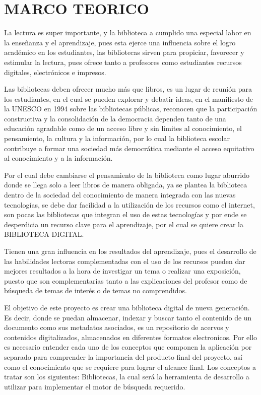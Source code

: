 \section{MARCO TEORICO} 

\begin{enumerate}[1.]
	
	La lectura es super importante, y la biblioteca a cumplido una especial labor en la enseñanza y el aprendizaje, pues esta ejerce una influencia sobre el logro académico en los estudiantes, las bibliotecas sirven para propiciar, favorecer y estimular la lectura, pues ofrece tanto a profesores como estudiantes recursos digitales, electrónicos e impresos. 
	
	Las bibliotecas deben ofrecer mucho más que libros, es un lugar de reunión para los estudiantes, en el cual se pueden explorar y debatir ideas, en el manifiesto de la UNESCO en 1994 sobre las bibliotecas públicas, reconocen que la participación constructiva y la consolidación de la democracia dependen tanto de una educación agradable como de un acceso libre y sin límites al conocimiento, el pensamiento, la cultura y la información, por lo cual la biblioteca escolar contribuye a formar una sociedad más democrática mediante el acceso equitativo al conocimiento y a la información.
	
	Por el cual debe cambiarse el pensamiento de la biblioteca como lugar aburrido donde se llega solo a leer libros de manera obligada, ya se plantea la biblioteca dentro de la sociedad del conocimiento de manera integrada con las nuevas tecnologías, se debe dar facilidad a la utilización de los recursos como el internet, son pocas las bibliotecas que integran el uso de estas tecnologías y por ende se desperdicia un recurso clave para el aprendizaje, por el cual se quiere crear la BIBLIOTECA DIGITAL.
	
	Tienen una gran influencia en los resultados del aprendizaje, pues el desarrollo de las habilidades lectoras complementadas con el uso de los recursos pueden dar mejores resultados a la hora de investigar un tema o realizar una exposición, puesto que son complementarias tanto a las explicaciones del profesor como de búsqueda de temas de interés o de temas no comprendidos. 
	
El objetivo de este proyecto es crear una biblioteca digital de nueva generación.
Es decir, donde se puedan almacenar, indexar y buscar tanto el contenido de un documento como sus metadatos asociados, es un repositorio de acervos y contenidos digitalizados, almacenados en diferentes formatos electronicos.
Por ello es necesario entender cada uno de los conceptos que componen la aplicación por separado para comprender la importancia 	del producto final del 	proyecto, así como el conocimiento que se requiere para lograr el alcance final.
Los conceptos a tratar son los siguientes: Bibliotecas, la cual será la	herramienta de desarrollo a utilizar para implementar el 	motor de búsqueda requerido. 



\end{enumerate} 
